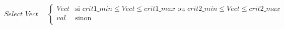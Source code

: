 \[
Select\_Vect =  \begin{cases}
Vect & \text{si } crit1\_min \leq Vect \leq crit1\_max  \text{ ou } 
 crit2\_min \leq Vect \leq crit2\_max \\
val & \text{sinon}\\
\end{cases}
\]
